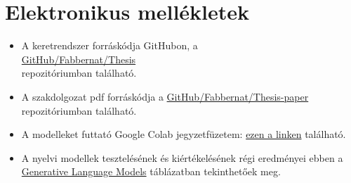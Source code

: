 \documentclass[12pt]{report}
\begin{document}
    \chapter*{Elektronikus mellékletek}

    \begin{itemize}
        \item A keretrendszer forráskódja GitHubon, a\\ \href{https://github.com/Fabbernat/Thesis}{GitHub/Fabbernat/Thesis}\\ repozitóriumban található.

        \item A szakdolgozat pdf forráskódja a \href{https://github.com/Fabbernat/Thesis-paper}{GitHub/Fabbernat/Thesis-paper}\\ repozitóriumban található.

        \item
        \label{att:colab}
        A modelleket futtató Google Colab jegyzetfüzetem:
        \href{https://colab.research.google.com/drive/1yA8IAd5z2oreKUXha-16Du2YrNhemNiU?usp=sharing}{ezen a linken}  található.

        \item A nyelvi modellek tesztelésének és kiértékelésének régi eredményei ebben a
        \href{https://docs.google.com/spreadsheets/d/1y49lg52LHVFmTom-0ibCqYqWA1pKKhiUny-Pf3KVTIg/edit?usp=sharing}{Generative Language Models}
        táblázatban tekinthetőek meg.
    \end{itemize}
\end{document}
